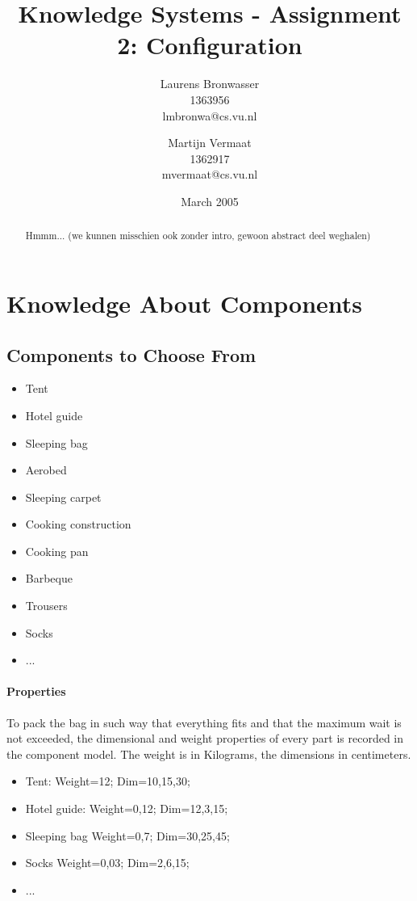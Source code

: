 \documentclass[a4paper,11pt]{article}
\title{Knowledge Systems - Assignment 2: Configuration}
\author{Laurens Bronwasser\\
1363956\\
lmbronwa@cs.vu.nl
\and
Martijn Vermaat\\
1362917\\
mvermaat@cs.vu.nl}
\date{March 2005}
\begin{document}
\maketitle


\renewcommand{\abstractname}{Introduction} %
\begin{abstract}
  Hmmm... (we kunnen misschien ook zonder intro, gewoon abstract
  deel weghalen)
\end{abstract}


\section*{Knowledge About Components}


\subsection*{Components to Choose From}

\begin{itemize}
\item Tent 
\item Hotel guide 
\item Sleeping bag 
\item Aerobed 
\item Sleeping carpet 
\item Cooking construction
\item Cooking pan
\item Barbeque
\item Trousers
\item Socks
\item ...
\end{itemize}

\paragraph{Properties}

To pack the bag in such way that everything fits and that the maximum wait is 
not exceeded, the dimensional and weight properties of every part is recorded in
the component model. The weight is in Kilograms, the dimensions in centimeters.

\begin{itemize}
\item Tent: Weight=12; Dim=10,15,30;
\item Hotel guide: Weight=0,12; Dim=12,3,15;
\item Sleeping bag Weight=0,7; Dim=30,25,45;
\item Socks Weight=0,03; Dim=2,6,15;
\item ...
\end{itemize}
\end{document}
